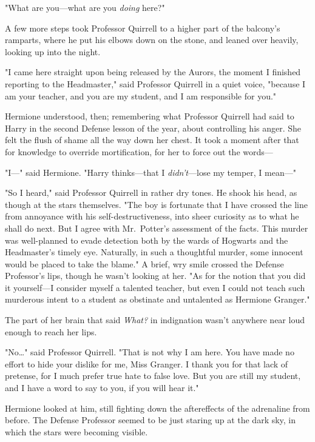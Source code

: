 "What are you---what are you \emph{doing} here?"

A few more steps took Professor Quirrell to a higher part of the balcony's 
ramparts, where he put his elbows down on the stone, and leaned over heavily, 
looking up into the night.

"I came here straight upon being released by the Aurors, the moment I finished 
reporting to the Headmaster," said Professor Quirrell in a quiet voice, 
"because I am your teacher, and you are my student, and I am responsible for 
you."

Hermione understood, then; remembering what Professor Quirrell had said to 
Harry in the second Defense lesson of the year, about controlling his anger. 
She felt the flush of shame all the way down her chest. It took a moment after 
that for knowledge to override mortification, for her to force out the words---

"I---" said Hermione. "Harry thinks---that I \emph{didn't}---lose my temper, I 
mean---"

"So I heard," said Professor Quirrell in rather dry tones. He shook his head, 
as though at the stars themselves. "The boy is fortunate that I have crossed 
the line from annoyance with his self-destructiveness, into sheer curiosity as 
to what he shall do next. But I agree with Mr.~Potter's assessment of the 
facts. This murder was well-planned to evade detection both by the wards of 
Hogwarts and the Headmaster's timely eye. Naturally, in such a thoughtful 
murder, some innocent would be placed to take the blame." A brief, wry smile 
crossed the Defense Professor's lips, though he wasn't looking at her. "As for 
the notion that you did it yourself---I consider myself a talented teacher, but 
even I could not teach such murderous intent to a student as obstinate and 
untalented as Hermione Granger."

The part of her brain that said \emph{What?} in indignation wasn't anywhere 
near loud enough to reach her lips.

"No{\ldots}" said Professor Quirrell. "That is not why I am here. You have made 
no effort to hide your dislike for me, Miss Granger. I thank you for that lack 
of pretense, for I much prefer true hate to false love. But you are still my 
student, and I have a word to say to you, if you will hear it."

Hermione looked at him, still fighting down the aftereffects of the adrenaline 
from before. The Defense Professor seemed to be just staring up at the dark 
sky, in which the stars were becoming visible.

